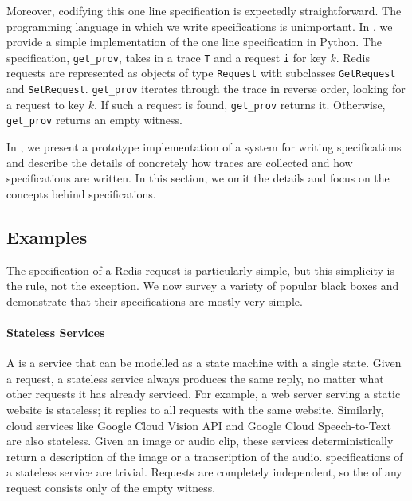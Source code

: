 Moreover, codifying this one line \watprovenance{} specification is expectedly
straightforward. The programming language in which we write \watprovenance{}
specifications is unimportant. In , we provide a simple
implementation of the one line \watprovenance{} specification in Python. The
specification, \texttt{get\_prov}, takes in a trace \texttt{T} and a \kvget{}
request \texttt{i} for key $k$. Redis requests are represented as objects of
type \texttt{Request} with subclasses \texttt{GetRequest} and
\texttt{SetRequest}.  \texttt{get\_prov} iterates through the trace in reverse
order, looking for a \kvset{} request to key $k$. If such a \kvset{} request is
found, \texttt{get\_prov} returns it. Otherwise, \texttt{get\_prov} returns an
empty witness.

{}

In , we present a prototype implementation of a system for
writing \watprovenance{} specifications and describe the details of concretely
how traces are collected and how \watprovenance{} specifications are written.
In this section, we omit the details and focus on the concepts behind
\watprovenance{} specifications.

\subsection{Examples}
The \watprovenance{} specification of a Redis \kvget{} request is particularly
simple, but this simplicity is the rule, not the exception. We now survey a
variety of popular black boxes and demonstrate that their \watprovenance{}
specifications are mostly very simple.

\paragraph{Stateless Services}
A  is a service that can be modelled as a state
machine with a single state. Given a request, a stateless service always
produces the same reply, no matter what other requests it has already serviced.
For example, a web server serving a static website is stateless; it replies to
all requests with the same website. Similarly, cloud services like Google Cloud
Vision API and Google Cloud Speech-to-Text are also stateless. Given an image
or audio clip, these services deterministically return a description of the
image or a transcription of the audio. \Watprovenance{} specifications of a
stateless service are trivial. Requests are completely independent, so the
\watprovenance{} of any request consists only of the empty witness.

